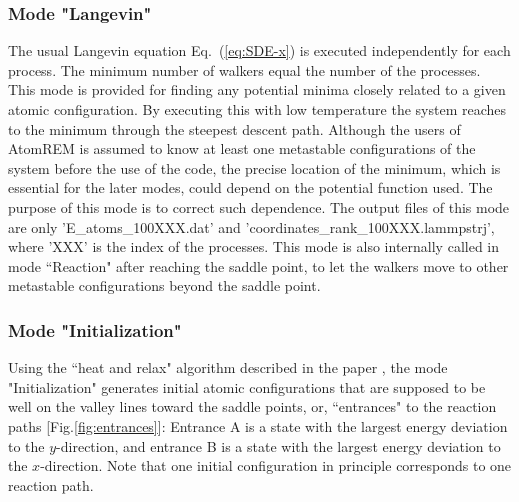 \documentclass[preprint,12pt]{elsarticle}
\begin{document}
  \subsubsection{Mode "Langevin"}
The usual Langevin equation Eq.~(\ref{eq:SDE-x}) is executed independently for each process. The minimum number of walkers equal the number of the processes. This mode is provided for finding any potential minima closely related to a given atomic configuration. By executing this with low temperature the system reaches to the minimum through the steepest descent path. Although the users of AtomREM is assumed to know at least one metastable configurations of the system before the use of the code, the precise location of the minimum, which is essential for the later modes, could depend on the potential function used. The purpose of this mode is to correct such dependence. The output files of this mode are only  ’E\_atoms\_100XXX.dat’ and ’coordinates\_rank\_100XXX.lammpstrj’, where 'XXX' is the index of the processes. This mode is also internally called in mode ``Reaction" after reaching the saddle point, to let the walkers move to other metastable configurations beyond the saddle point.

  \subsubsection{Mode "Initialization"}
Using the ``heat and relax" algorithm described in the paper \cite{Nagornov}, the mode "Initialization" generates initial atomic configurations that are supposed to be well on the valley lines toward the saddle points, or, ``entrances" to the reaction paths [Fig.\ref{fig:entrances}]: Entrance A is a state with the largest energy deviation to the $y$-direction, and entrance B is a state with the largest energy deviation to the $x$-direction. Note that one initial configuration in principle corresponds to one reaction path.%
\end{document}
